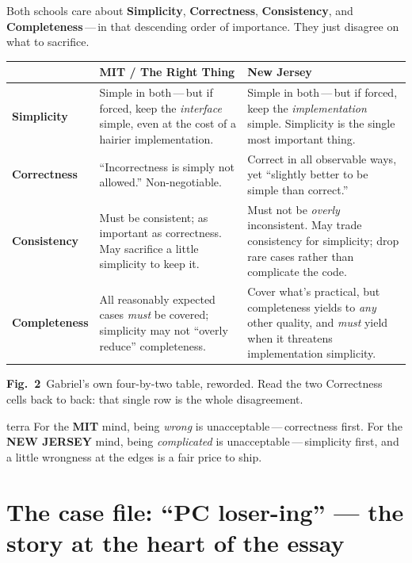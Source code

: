 \documentclass[11pt]{article}
\let\oldsection\section
\renewcommand{\section}[1]{\oldsection{\sffamily\bfseries\large #1}}
\newenvironment{keybox}[1][The idea]{\begin{sidebox}[#1]{terra}}{\end{sidebox}}
\newcommand{\figcap}[2]{\par\vspace{2pt}\noindent
  {\sffamily\footnotesize\color{terra}\textbf{Fig.\ #1}}\,%
  {\firabook\footnotesize\color{faint}\enspace#2}\par}
\newcommand{\NJ}{\textcolor{terra}{\sffamily\bfseries NEW JERSEY}}
\newcommand{\MITs}{\textcolor{slate}{\sffamily\bfseries MIT}}
\begin{document}
\vspace{4pt}
Both schools care about \textbf{Simplicity}, \textbf{Correctness},
\textbf{Consistency}, and \textbf{Completeness}\,---\,in that descending order of
importance. They just disagree on what to sacrifice.

\vspace{4pt}
{\small
\begin{longtable}{@{}>{\sffamily\bfseries}p{2.0cm} >{\RaggedRight}p{5.4cm} >{\RaggedRight}p{5.4cm}@{}}
\toprule
& \cellcolor{slatesoft}\sffamily\bfseries\color{slate}MIT / The Right Thing
& \cellcolor{terrasoft}\sffamily\bfseries\color{terra}New Jersey \\
\midrule
\endhead
Simplicity &
Simple in both\,---\,but if forced, keep the \emph{interface} simple, even at the
cost of a hairier implementation. &
Simple in both\,---\,but if forced, keep the \emph{implementation} simple.
Simplicity is the single most important thing. \\[2pt]
Correctness &
``Incorrectness is simply not allowed.'' Non-negotiable. &
Correct in all observable ways, yet ``slightly better to be simple than
correct.'' \\[2pt]
Consistency &
Must be consistent; as important as correctness. May sacrifice a little
simplicity to keep it. &
Must not be \emph{overly} inconsistent. May trade consistency for simplicity;
drop rare cases rather than complicate the code. \\[2pt]
Completeness &
All reasonably expected cases \emph{must} be covered; simplicity may not
``overly reduce'' completeness. &
Cover what's practical, but completeness yields to \emph{any} other quality, and
\emph{must} yield when it threatens implementation simplicity. \\
\bottomrule
\end{longtable}}
\figcap{2}{Gabriel's own four-by-two table, reworded. Read the two Correctness
cells back to back: that single row is the whole disagreement.}

\begin{keybox}[The difference in one line]
For the \MITs{} mind, being \emph{wrong} is unacceptable\,---\,correctness first.
For the \NJ{} mind, being \emph{complicated} is unacceptable\,---\,simplicity
first, and a little wrongness at the edges is a fair price to ship.
\end{keybox}

\section{The case file: ``PC loser-ing'' --- the story at the heart of the essay}
\end{document}
